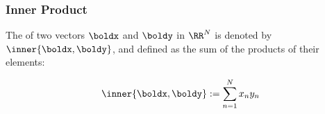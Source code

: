


\begin{frame}
    \frametitle{Inner Product}
    
     \vspace{2em}
    The  of two vectors $\boldx$ and $\boldy$ in $\RR^N$ is
    denoted by $\inner{\boldx,  \boldy}$, and defined
    as the sum of the products of their elements:
    
    \vspace{.7em}
    \begin{equation*}
        \label{eq:dipv}
        \inner{\boldx,  \boldy} := \sum_{n=1}^N x_n y_n 
    \end{equation*}
    
    
\end{frame}







    

